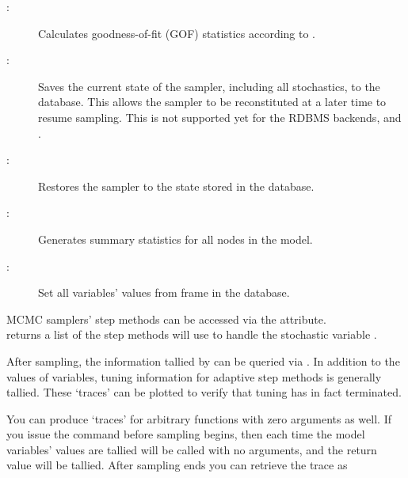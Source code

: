 \documentclass[]{jss}
\begin{document}
\begin{description}
    \item[:] Calculates goodness-of-fit (GOF) statistics according to \citet{Brooks:2000il}.
    \item[:] Saves the current state of the sampler, including all stochastics, to the database. This allows the sampler to be reconstituted at a later time to resume sampling. This is not supported yet for the RDBMS backends,  and .
    \item[:] Restores the sampler to the state stored in the database.
   \item[:] Generates summary statistics for all nodes in the model.
    \item[:] Set all variables' values from frame  in the database.
\end{description}

MCMC samplers' step methods can be accessed via the  attribute. \\ returns a list of the step methods  will use to handle the stochastic variable .

After sampling, the information tallied by   can be queried via . In addition to the values of variables, tuning information for adaptive step methods is generally tallied. These `traces' can be plotted to verify that tuning has in fact terminated.

You can produce `traces' for arbitrary functions with zero arguments as well. If you issue the command  before sampling begins, then each time the model variables' values are tallied  will be called with no arguments, and the return value will be tallied. After sampling ends you can retrieve the trace as 
\end{document}
